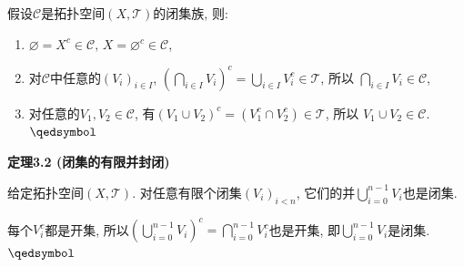 \documentclass[UTF8]{ctexart}
\begin{document}

假设$\mathcal{C}$是拓扑空间$(X,\mathcal{T})$的闭集族, 则:
\begin{enumerate}
    \item $\varnothing=X^c\in\mathcal{C},\,X=\varnothing^c\in\mathcal{C}$,
    \vspace{3pt}
    \item 对$\mathcal{C}$中任意的$(V_i)_{i\in I}$,
    $\displaystyle\left(\bigcap_{i\in I}V_i\right)^c
    =\bigcup_{i\in I}V_i^c\in\mathcal{T}$, 所以
    $\displaystyle\bigcap_{i\in I}V_i\in\mathcal{C}$,
    \vspace{3pt}
    \item 对任意的$V_1,V_2\in\mathcal{C}$,
    有$(V_1\cup V_2)^c=(V_1^c\cap V_2^c)\in\mathcal{T}$, 所以
    $V_1\cup V_2\in\mathcal{C}$. \hfill $\qedsymbol$
\end{enumerate}

\vspace{10pt}

\hypertarget{sec:定理3.2}{}
\noindent\textbf{定理3.2 (闭集的有限并封闭)}

给定拓扑空间$(X,\mathcal{T})$. 对任意有限个闭集$(V_i)_{i<n}$,
它们的并$\displaystyle\bigcup_{i=0}^{n-1}V_i$也是闭集.


每个$V_i^c$都是开集, 所以$\displaystyle\left(\bigcup_{i=0}^{n-1}V_i\right)^c
=\bigcap_{i=0}^{n-1}V_i^c$也是开集,
即$\displaystyle\bigcup_{i=0}^{n-1}V_i$是闭集. \hfill $\qedsymbol$



\end{document}
